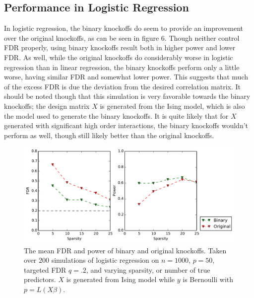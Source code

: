 \documentclass[11pt]{article}
\theoremstyle{definition}
\begin{document}
\subsection{Performance in Logistic Regression} 
    \FloatBarrier
    In logistic regression, the binary knockoffs do seem to provide an improvement over the original knockoffs, as can be seen in figure 6. Though neither control FDR properly, using binary knockoffs result both in higher power and lower FDR. As well, while the original knockoffs do considerably worse in logistic regression than in linear regression, the binary knockoffs perform only a little worse, having similar FDR and somewhat lower power. This suggests that much of the excess FDR is due the deviation from the desired correlation matrix. It should be noted though that this simulation is very favorable towards the binary knockoffs; the design matrix $X$ is generated from the Ising model, which is also the model used to generate the binary knockoffs. It is quite likely that for $X$ generated with significant high order interactions, the binary knockoffs wouldn't perform as well, though still likely better than the original knockoffs. 
    \begin{figure}[h]
        \begin{center}
        \includegraphics[width=14cm]{images/logit_FDR_power_50}
    \end{center}
    \caption{The mean FDR and power of binary and original knockoffs. Taken over $200$ simulations of logistic regression on $n=1000$, $p=50$, targeted FDR $q=.2$, and varying sparsity, or number of true predictors. $X$ is generated from Ising model while $y$ is Bernoulli with $p=L(X\beta)$.}  
    \end{figure}
\end{document}
